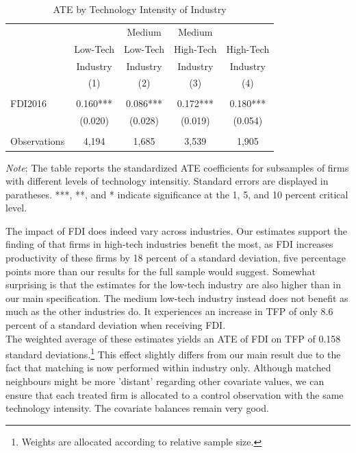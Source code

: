 \documentclass[a4paper,11pt]{scrartcl}
\begin{document}
\begin{table}[h!]
  \centering
   \caption{ATE by Technology Intensity of Industry}
   \label{tab:TECH}
\begin{threeparttable}
 
\begin{tabular}{lcccc}
 \hline
 \hline
 & & Medium & Medium &  \\ 
 & Low-Tech & Low-Tech & High-Tech & High-Tech \\ 
 & Industry & Industry & Industry & Industry \\ 
 & (1) & (2) & (3) & (4) \\
 \hline
 &  &  &  &  \\
FDI2016 & 0.160*** & 0.086*** & 0.172*** & 0.180*** \\
	      & (0.020) & (0.028) & (0.019) & (0.054) \\
	      &  &  &  &  \\
 Observations & 4,194 & 1,685 & 3,539 & 1,905 \\ 
	\hline
	\hline
\end{tabular}	

\begin{tablenotes}[flushleft]
     \footnotesize     
\item \textit{Note}: The table reports the standardized ATE coefficients for subsamples of firms with different levels of technology intensitiy. Standard errors are displayed in paratheses. ***, **, and * indicate significance at the 1, 5, and 10 percent critical level. 

\end{tablenotes}


\end{threeparttable}
\end{table}

The impact of FDI does indeed vary across industries. Our estimates support the finding of \citet{Keller2009} that firms in high-tech industries benefit the most, as FDI increases productivity of these firms by 18 percent of a standard deviation, five percentage points more than our results for the full sample would suggest. Somewhat surprising is that the estimates for the low-tech industry are also higher than in our main specification. The medium low-tech industry instead does not benefit as much as the other industries do. It experiences an increase in TFP of only 8.6 percent of a standard deviation when receiving FDI. 
\\
The weighted average of these estimates yields an ATE of FDI on TFP of 0.158 standard deviations.\footnote{Weights are allocated according to relative sample size.} This effect slightly differs from our main result due to the fact that matching is now performed within industry only. Although matched neighbours might be more 'distant' regarding other covariate values, we can ensure that each treated firm is allocated to a control observation with the same technology intensity. The covariate balances remain very good. 
\end{document}
